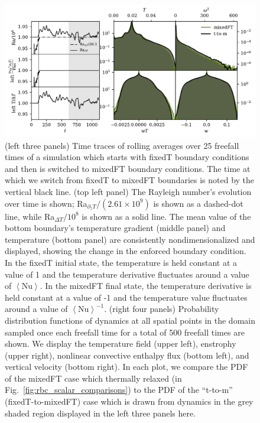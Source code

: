 \documentclass[aps, pre, onecolumn, nofootinbib, notitlepage, groupedaddress, amsfonts, amssymb, amsmath, longbibliography, superscriptaddress]{revtex4-1}
\newcommand{\angles}[1]{\ensuremath{\left\langle #1 \right\rangle}}
\begin{document}
\begin{figure}
\includegraphics[width=\textwidth]{./figs/rbc_restart_description.pdf}
\caption{ 
	(left three panels) Time traces of rolling averages over 25 freefall times of a simulation which starts with fixedT boundary conditions and then is switched to mixedFT boundary conditions.
	The time at which we switch from fixedT to mixedFT boundaries is noted by the vertical black line.
	(top left panel) The Rayleigh number's evolution over time is shown; Ra$_{\partial_z T}/(2.61\times 10^9)$ is shown as a dashed-dot line, while Ra$_{\Delta T}/10^8$ is shown as a solid line.
	The mean value of the bottom boundary's temperature gradient (middle panel) and temperature (bottom panel) are consistently nondimensionalized and displayed, showing the change in the enforced boundary condition.
	In the fixedT initial state, the temperature is held constant at a value of 1 and the temperature derivative fluctuates around a value of $\angles{\text{Nu}}$.
	In the mixedFT final state, the temperature derivative is held constant at a value of -1 and the temperature value fluctuates around a value of $\angles{\text{Nu}}^{-1}$.
	(right four panels) Probability distribution functions of dynamics at all spatial points in the domain sampled once each freefall time for a total of 500 freefall times are shown.
	We display the temperature field (upper left), enstrophy (upper right), nonlinear convective enthalpy flux (bottom left), and vertical velocity (bottom right).
	In each plot, we compare the PDF of the mixedFT case which thermally relaxed (in Fig.~\ref{fig:rbc_scalar_comparisons}) to the PDF of the ``t-to-m'' (fixedT-to-mixedFT) case which is drawn from dynamics in the grey shaded region displayed in the left three panels here.
\label{fig:rbc_restart_description} }
\end{figure}
\end{document}
